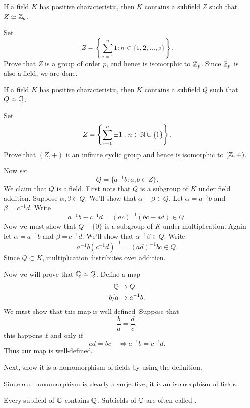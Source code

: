 \documentclass{ximera}
\begin{document}
\begin{theorem}
  If a field $K$ has positive characteristic, then $K$ contains a
  subfield $Z$ such that $Z\simeq \mathbb Z_p$.
  \begin{sketch}
    Set
    \[
    Z =\left\{\sum_{i=1}^n 1:n\in\{1,2,\dots,p\}\right\}.
    \]
    Prove that $Z$ is a group of order $p$, and hence is isomorphic to
    $\mathbb Z_p$. Since $\mathbb Z_p$ is also a field, we are done.
  \end{sketch}
\end{theorem}





\begin{theorem}
  If a field $K$ has positive characteristic, then $K$ contains a
  subfield $Q$ such that $Q\simeq \mathbb Q$.
  \begin{sketch}
    Set
    \[
    Z =\left\{\sum_{i=1}^n \pm 1:n\in \mathbb N\cup\{0\}\right\}.
    \]
    Prove that $(Z,+)$ is an infinite cyclic group and hence is
    isomorphic to $(\mathbb Z,+)$.

    Now set
    \[
    Q = \{a^{-1}b : a,b\in Z\}.
    \]
    We claim that $Q$ is a field. First note that $Q$ is a subgroup of
    $K$ under field addition. Suppose $\alpha,\beta\in Q$. We'll
    show that $\alpha-\beta\in Q$. Let $\alpha = a^{-1}b$ and $\beta=
    c^{-1}d$. Write
    \[
    a^{-1}b - c^{-1} d = (ac)^{-1}(bc- ad)\in Q.
    \]
    Now we must show that $Q-\{0\}$ is a subgroup of $K$ under
    multiplication. Again let $\alpha = a^{-1}b$ and $\beta=
    c^{-1}d$. We'll show that $\alpha^{-1}\beta \in Q$. Write
    \[
    a^{-1}b (c^{-1}d)^{-1} = (ad)^{-1} bc\in Q.
    \]
    Since $Q\subset K$, multiplication distributes over addition.

    Now we will prove that $\mathbb Q\simeq Q$. Define a map
    \begin{align*}
      \mathbb Q &\to Q\\
      b/a &\mapsto a^{-1} b.
    \end{align*}
    We must show that this map is well-defined.
    Suppose that
    \[
    \frac{b}{a} = \frac{d}{c},
    \]
    this happens if and only if
    \[
    ad = bc\quad\Leftrightarrow a^{-1} b = c^{-1} d.
    \]
    Thus our map is well-defined.

    Next, show it is a homomorphism of fields by using the definition.


    Since our homomorphism is clearly a surjective, it is an
    isomorphism of fields.
  \end{sketch}
\end{theorem}

\begin{corollary}
  Every subfield of $\mathbb C$ contains $\mathbb Q$. Subfields of $\mathbb C$ are often
  called .
\end{corollary}
\end{document}
